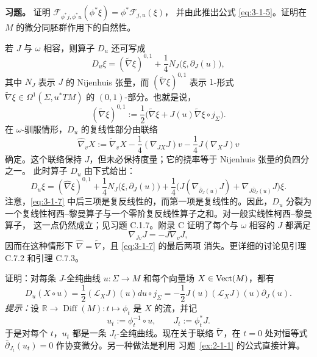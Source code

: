 \medskip\noindent\textbf{习题。}
证明
$\mathcal F_{\phi^*j,\phi^*u}(\phi^*\xi)=\phi^*\mathcal F_{j,u}(\xi)$，
并由此推出公式 \eqref{eq:3-1-5}。证明在 $M$ 的微分同胚群作用下的自然性。

\begin{remark}\label{rem:3-1-3}
若 $J$ 与 $\omega$ 相容，则算子 $D_u$ 还可写成
\begin{equation}\label{eq:3-1-6}
  D_u\xi=(\widetilde\nabla\xi)^{0,1}
  +\frac14N_J\bigl(\xi,\partial_J(u)\bigr),
\end{equation}
其中 $N_J$ 表示 $J$ 的 Nijenhuis 张量，而
$(\widetilde\nabla\xi)^{0,1}$ 表示 $1$-形式
$\widetilde\nabla\xi\in\Omega^1(\Sigma,u^*TM)$ 的 $(0,1)$-部分。也就是说，
\[
  (\widetilde\nabla\xi)^{0,1}
  :=\frac12\bigl(
    \widetilde\nabla\xi+J(u)\widetilde\nabla\xi\circ j_\Sigma
  \bigr).
\]
在 $\omega$-驯服情形，$D_u$ 的复线性部分由联络
\[
  \widehat\nabla_vX
  :=\widetilde\nabla_vX
  -\frac14(\nabla_{JX}J)v
  -\frac14J(\nabla_XJ)v
\]
确定。这个联络保持 $J$，但未必保持度量；它的挠率等于 Nijenhuis 张量的负四分之一。
此时算子 $D_u$ 由下式给出：
\begin{equation}\label{eq:3-1-7}
  D_u\xi
  =(\widehat\nabla\xi)^{0,1}
  +\frac14N_J\bigl(\xi,\partial_J(u)\bigr)
  +\frac14\bigl(
    J(\nabla_{\bar\partial_J(u)}J)
    +\nabla_{J\bar\partial_J(u)}J
  \bigr)\xi.
\end{equation}
注意，\eqref{eq:3-1-7} 中后三项是复反线性的，而第一项是复线性的。因此，$D_u$ 分裂为
一个复线性柯西--黎曼算子与一个零阶复反线性算子之和。对一般实线性柯西--黎曼算子，
这一点仍然成立；见习题 C.1.7。附录 C 证明了每个与 $\omega$ 相容的 $J$ 都满足
\[
  \nabla_{Jv}J=-J\nabla_vJ,
\]
因而在这种情形下 $\widehat\nabla=\widetilde\nabla$，且 \eqref{eq:3-1-7} 的最后两项
消失。更详细的讨论见引理 C.7.2 和引理 C.7.3。
\end{remark}

\begin{exercise}\label{ex:3-1-4}
证明：对每条 $J$-全纯曲线 $u:\Sigma\to M$ 和每个向量场
$X\in\operatorname{Vect}(M)$，都有
\[
  D_u(X\circ u)
  =\frac12(\mathcal L_XJ)(u)du\circ j_\Sigma
  =-\frac12J(u)(\mathcal L_XJ)(u)\partial_J(u).
\]
\textit{提示：}设
$\mathbb R\to\operatorname{Diff}(M):t\mapsto\phi_t$ 是 $X$ 的流，并记
\[
  u_t:=\phi_t^{-1}\circ u,\qquad J_t:=\phi_t^*J.
\]
于是对每个 $t$，$u_t$ 都是一条 $J_t$-全纯曲线。现在关于联络
$\widetilde\nabla$，在 $t=0$ 处对恒等式
$\bar\partial_{J_t}(u_t)=0$ 作协变微分。另一种做法是利用
习题~\ref{ex:2-1-1} 的公式直接计算。
\end{exercise}

